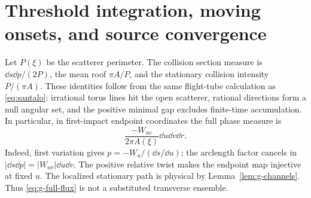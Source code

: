 \section{Threshold integration, moving onsets, and source convergence}
\label{sec:g-integration}
Let $P(\xi)$ be the scatterer perimeter. The collision section measure is
$\dd s\dd p/(2P)$, the mean roof $\pi A/P$, and the stationary collision
intensity $P/(\pi A)$. These identities follow from the same flight-tube
calculation as \eqref{eq:santalo}: irrational torus lines hit the open
scatterer, rational directions form a null angular set, and the positive
minimal gap excludes finite-time accumulation. In particular, in
first-impact endpoint coordinates the full phase measure is
\begin{equation}\label{eq:g-full-flux}
             \frac{-W_{uv}}{2\pi A(\xi)}\dd u\dd v\dd r.
\end{equation}
Indeed, first variation gives $p=-W_u/(\dd s/\dd u)$; the arclength
factor cancels in $|\dd s\dd p|=|W_{uv}|\dd u\dd v$. The positive
relative twist makes the endpoint map injective at fixed $u$. The
localized stationary path is physical by Lemma~\ref{lem:g-channels}.
Thus \eqref{eq:g-full-flux} is not a substituted transverse ensemble.

